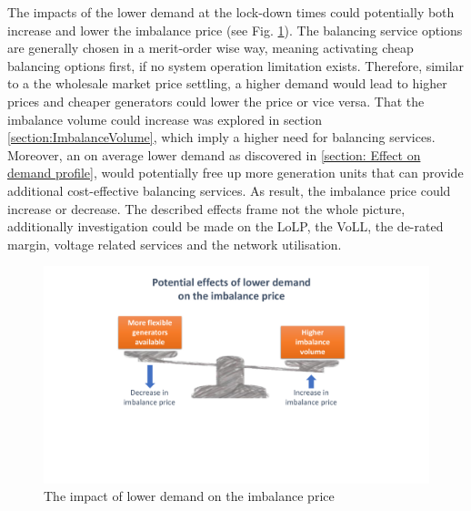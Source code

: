 \documentclass[energies,article,submit,moreauthors,pdftex]{Definitions/mdpi}
\begin{document}
The impacts of the lower demand at the lock-down times could potentially both increase and lower the imbalance price (see Fig. \ref{fig:imbalance-trade-off}). The balancing service options are generally chosen in a merit-order wise way, meaning activating cheap balancing options first, if no system operation limitation exists. Therefore, similar to a the wholesale market price settling, a higher demand would lead to higher prices and cheaper generators could lower the price or vice versa. That the imbalance volume could increase was explored in section \ref{section:ImbalanceVolume}, which imply a higher need for balancing services. Moreover, an on average lower demand as discovered in \ref{section: Effect on demand profile}, would potentially free up more generation units that can provide additional cost-effective balancing services. As result, the imbalance price could increase or decrease. The described effects frame not the whole picture, additionally investigation could be made on the LoLP, the VoLL, the de-rated margin, voltage related services and the network utilisation.

\begin{figure}[H]
\centering
\hspace{-25pt}
\includegraphics[trim={4cm 6.3cm 5cm 1cm},clip,width=13cm]{Graphics/Imbalance-price-trade-off.pdf}
\caption{The impact of lower demand on the imbalance price}
\label{fig:imbalance-trade-off}
\end{figure} 


\end{document}
